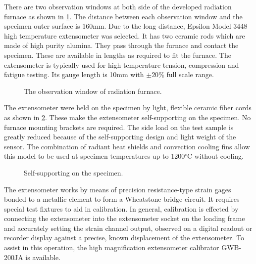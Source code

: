 There are two observation windows at both side of the developed radiation furnace as shown in \ref{Fig:ObservationWindow}.
The distance between each observation window and the specimen outer surface is 160mm.
Due to the long distance, Epsilon Model 3448 high temperature extensometer was selected.
It has two ceramic rods which are made of high purity alumina.
They pass through the furnace and contact the specimen.
These are available in lengths as required to fit the furnace.
The extensometer is typically used for high temperature tension, compression and fatigue testing.
Its gauge length is 10mm with $\pm20\%$ full scale range.

\begin{figure}[!htp]
\centering{}
\caption{The observation window of radiation furnace.}
\label{Fig:ObservationWindow}
\end{figure}

The extensometer were held on the specimen by light, flexible ceramic fiber cords as shown in \ref{Fig:Epsilon3448}.
These make the extensometer self-supporting on the specimen.
No furnace mounting brackets are required.
The side load on the test sample is greatly reduced because of the self-supporting design and light weight of the sensor.
The combination of radiant heat shields and convection cooling fins allow this model to be used at specimen temperatures up to 1200$^{\circ}$C without cooling.
\begin{figure}[!htp]
\centering{}
\caption{Self-supporting on the specimen.}
\label{Fig:Epsilon3448}
\end{figure}

The extensometer works by means of precision resistance-type strain gages bonded to a metallic element to form a Wheatstone bridge circuit.
It requires special test fixtures to aid in calibration.
In general, calibration is effected by connecting the extensometer into the extensometer socket on the loading frame and accurately setting the strain channel output, observed on a digital readout or recorder display against a precise, known displacement of the extensometer.
To assist in this operation, the high magnification extensometer calibrator GWB-200JA is available.

